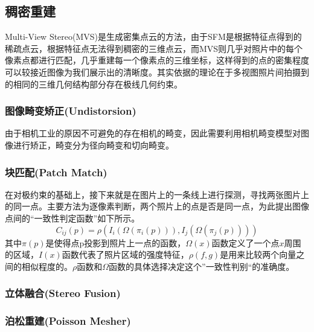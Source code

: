 \documentclass[10pt]{article}
\begin{document}
\subsection{稠密重建}
Multi-View Stereo(MVS)是生成密集点云的方法，由于SFM是根据特征点得到的稀疏点云，根据特征点无法得到稠密的三维点云，而MVS则几乎对照片中的每个像素点都进行匹配，几乎重建每一个像素点的三维坐标，这样得到的点的密集程度可以较接近图像为我们展示出的清晰度。其实依据的理论在于多视图照片间拍摄到的相同的三维几何结构部分存在极线几何约束。
\subsubsection{图像畸变矫正(Undistorsion)}
由于相机工业的原因不可避免的存在相机的畸变，因此需要利用相机畸变模型对图像进行矫正，畸变分为径向畸变和切向畸变。
\subsubsection{块匹配(Patch Match)}
在对极约束的基础上，接下来就是在图片上的一条线上进行探测，寻找两张图片上的同一点。主要方法为逐像素判断，两个照片上的点是否是同一点，为此提出图像点间的“一致性判定函数”如下所示。
\begin{equation}
C_{ij}(p)=\rho(I_i(\Omega(\pi_i(p))),I_j(\Omega(\pi_j(p))))
\end{equation}
其中$\pi(p)$是使得点p投影到照片上一点的函数，$\Omega(x)$函数定义了一个点$x$周围的区域，$I(x)$函数代表了照片区域的强度特征，$\rho(f,g)$是用来比较两个向量之间的相似程度的。$\rho$函数和$\Omega$函数的具体选择决定这个”一致性判别“的准确度。

\subsubsection{立体融合(Stereo Fusion)}

\subsubsection{泊松重建(Poisson Mesher)}
\end{document}
